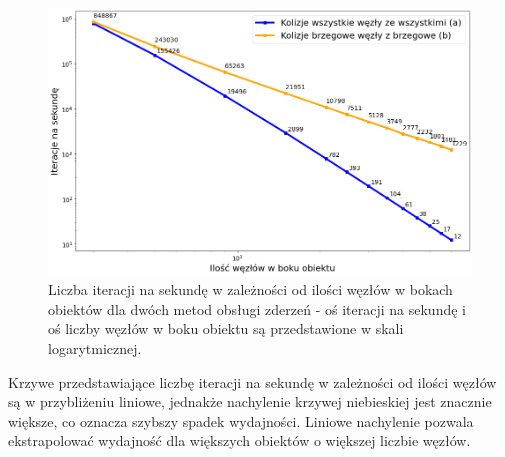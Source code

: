 \documentclass[12pt, letterpaper]{report}
\begin{document}
    \begin{figure}[H]
        \centering
        \includegraphics[width=16cm]{performance_side_size_log_log}
        \caption{
            Liczba iteracji na sekundę w zależności od 
            ilości węzłów w bokach obiektów dla dwóch metod obsługi zderzeń -
            oś iteracji na sekundę i oś liczby węzłów w boku obiektu są przedstawione w skali logarytmicznej.
        }
    \end{figure}

    Krzywe przedstawiające liczbę iteracji na sekundę w zależności od ilości węzłów są w przybliżeniu liniowe,
    jednakże nachylenie krzywej niebieskiej jest znacznie większe, co oznacza szybszy spadek wydajności.
    Liniowe nachylenie pozwala ekstrapolować wydajność dla większych obiektów o większej liczbie węzłów. \\
\end{document}
